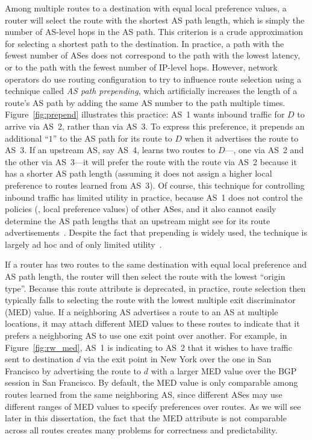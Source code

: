 Among multiple routes to a destination with equal local preference
values, a router will 
select the route with the shortest AS path length, which is simply
the number of AS-level hops in the AS path.  This criterion is 
a crude approximation for selecting a shortest path to the destination.
In practice, a
path with the fewest number of ASes does not correspond to the
path with the lowest latency, or to the path with the fewest number of
IP-level hops.  However, network operators do use routing configuration
to try to influence route selection using a technique called {\em AS
path prepending}, which artificially increases the length of a route's AS
path by adding the same AS number to the path multiple times.
Figure~\ref{fig:prepend} illustrates this practice: AS~1 wants inbound
traffic for $D$ to arrive via AS~2, rather than via AS~3.  To express
this preference, it
prepends an additional ``$1$'' to the AS path for its route to $D$ when
it advertises the route to AS~3.  If an upstream AS, say AS~4, learns
two routes to $D$---\ie, one via AS~2 and the other via AS~3---it will
prefer the route with the route via AS~2 because it has a shorter AS path
length (assuming it does not assign a higher local preference to routes
learned from AS~3).  Of course, this technique for controlling inbound
traffic has limited utility in practice, because AS~1 does not control
the policies (\ie, local preference values) of other ASes, and it also
cannot easily determine the AS path lengths that an upstream might see
for its route advertisements~\cite{Gao2005}.  Despite the fact that
prepending is widely used, the technique is largely ad hoc and of
only limited utility~\cite{Feamster2003e, Quoitin2005}.


If a router has two routes to the same destination with equal local
preference and AS path length, the router will then select the route with the
lowest ``origin type''.  Because this route attribute is deprecated, in
practice, 
route selection then typically falls to selecting the route with the
lowest multiple exit discriminator (MED) value.  If a neighboring AS
advertises a route to an AS at multiple locations, it may attach
different MED values to these routes to indicate that it prefers a
neighboring AS to use one exit point over another.  For example, in
Figure~\ref{fig:rw_med}, AS~1 is indicating to AS~2 that it wishes to
have traffic sent to destination $d$ via the exit point in New York
over the one in San Francisco by advertising the route to $d$ with a larger
MED value over the BGP session in San Francisco.  By default, the MED value is
only comparable among routes learned from the same neighboring AS, since
different ASes may use different ranges of MED values to specify
preferences over routes.  As we will see later in this dissertation, the
fact that the MED attribute is not comparable across all routes creates
many problems for correctness and predictability.

